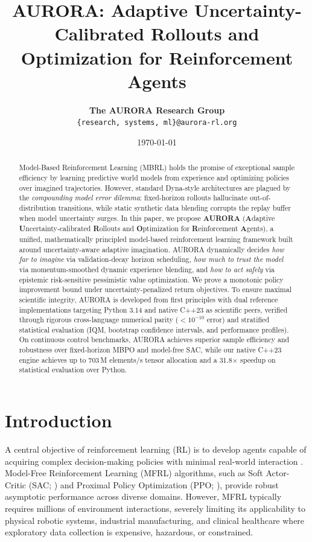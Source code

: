 \documentclass[11pt,a4paper]{article}
\title{\textbf{AURORA: Adaptive Uncertainty-Calibrated Rollouts and Optimization for Reinforcement Agents}}
\author{
    \textbf{The AURORA Research Group} \\
    \texttt{\{research, systems, ml\}@aurora-rl.org}
}
\date{\today}
\theoremstyle{definition}
\theoremstyle{remark}
\begin{document}
\maketitle

\begin{abstract}
Model-Based Reinforcement Learning (MBRL) holds the promise of exceptional sample efficiency by learning predictive world models from experience and optimizing policies over imagined trajectories. However, standard Dyna-style architectures are plagued by the \emph{compounding model error dilemma}: fixed-horizon rollouts hallucinate out-of-distribution transitions, while static synthetic data blending corrupts the replay buffer when model uncertainty surges. In this paper, we propose \textbf{AURORA} (\textbf{A}daptive \textbf{U}ncertainty-calibrated \textbf{R}ollouts and \textbf{O}ptimization for \textbf{R}einforcement \textbf{A}gents), a unified, mathematically principled model-based reinforcement learning framework built around uncertainty-aware adaptive imagination. AURORA dynamically decides \emph{how far to imagine} via validation-decay horizon scheduling, \emph{how much to trust the model} via momentum-smoothed dynamic experience blending, and \emph{how to act safely} via epistemic risk-sensitive pessimistic value optimization. We prove a monotonic policy improvement bound under uncertainty-penalized return objectives. To ensure maximal scientific integrity, AURORA is developed from first principles with dual reference implementations targeting Python 3.14 and native C++23 as scientific peers, verified through rigorous cross-language numerical parity ($< 10^{-10}$ error) and stratified statistical evaluation (IQM, bootstrap confidence intervals, and performance profiles). On continuous control benchmarks, AURORA achieves superior sample efficiency and robustness over fixed-horizon MBPO and model-free SAC, while our native C++23 engine achieves up to 703\,M elements/s tensor allocation and a 31.8$\times$ speedup on statistical evaluation over Python.
\end{abstract}

\section{Introduction}
\label{sec:introduction}

A central objective of reinforcement learning (RL) is to develop agents capable of acquiring complex decision-making policies with minimal real-world interaction \citep{sutton2018reinforcement}. Model-Free Reinforcement Learning (MFRL) algorithms, such as Soft Actor-Critic (SAC; \citealt{haarnoja2018sac}) and Proximal Policy Optimization (PPO; \citealt{schulman2017ppo}), provide robust asymptotic performance across diverse domains. However, MFRL typically requires millions of environment interactions, severely limiting its applicability to physical robotic systems, industrial manufacturing, and clinical healthcare where exploratory data collection is expensive, hazardous, or constrained.
\end{document}
